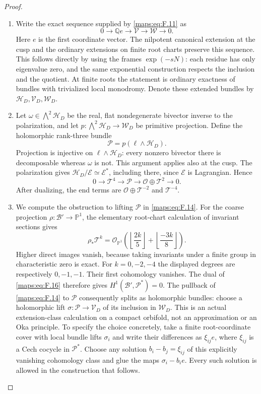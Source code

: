 \begin{proof}
\begin{enumerate}[label=\arabic*.]
\item Write the exact sequence supplied by \eqref{maps:eq:F.11} as
\[
 0\longrightarrow\mathbb Q e\longrightarrow\mathcal V
   \longrightarrow\mathcal W\longrightarrow0.
 \tag{F.14}\label{maps:eq:F.14}
\]
Here $e$ is the first coordinate vector.  The nilpotent canonical
extension at the cusp and the ordinary extensions on finite root
charts preserve this sequence.  This follows directly by using
the frames $\exp(-sN)$: each residue has only eigenvalue zero,
and the same exponential construction respects the inclusion and
the quotient.  At finite roots the statement is ordinary exactness
of bundles with trivialized local monodromy.  Denote these extended
bundles by $\mathcal H_D,\mathcal V_D,\mathcal W_D$.

\item Let $\omega\in\bigwedge^2\mathcal H_D$ be the real, flat
nondegenerate bivector inverse to the polarization, and let
$p:\bigwedge^2\mathcal H_D\to\mathcal W_D$ be primitive projection.
Define the holomorphic rank-three bundle
\[
 \mathcal P=p(\ell\wedge\mathcal H_D).
 \tag{F.15}\label{maps:eq:F.15}
\]
Projection is injective on $\ell\wedge\mathcal H_D$: every
nonzero bivector there is decomposable whereas $\omega$ is not.
This argument applies also at the cusp.  The polarization gives
$\mathcal H_D/\mathcal E\simeq\mathcal E^*$, including there,
since $\mathcal E$ is Lagrangian.  Hence
\[
 0\longrightarrow\mathcal T^4\longrightarrow\mathcal P
 \longrightarrow\mathcal O\oplus\mathcal T^2\longrightarrow0.
 \tag{F.16}\label{maps:eq:F.16}
\]
After dualizing, the end terms are
$\mathcal O\oplus\mathcal T^{-2}$ and $\mathcal T^{-4}$.

\item We compute the obstruction to lifting $\mathcal P$ in \eqref{maps:eq:F.14}.
For the coarse projection $\rho:\mathcal B'\to\mathbb P^1$,
the elementary root-chart calculation of invariant sections gives
\[
 \rho_*\mathcal T^k=
 \mathcal O_{\mathbb P^1}
 \left(\left\lfloor\frac{2k}{5}\right\rfloor+
       \left\lfloor\frac{-3k}{8}\right\rfloor\right).
 \tag{F.17}\label{maps:eq:F.17}
\]
Higher direct images vanish, because taking invariants under a
finite group in characteristic zero is exact.  For $k=0,-2,-4$
the displayed degrees are respectively $0,-1,-1$.  Their first
cohomology vanishes.  The dual of \eqref{maps:eq:F.16} therefore gives
$H^1(\mathcal B',\mathcal P^*)=0$.
The pullback of \eqref{maps:eq:F.14} to $\mathcal P$ consequently splits as
holomorphic bundles: choose a holomorphic lift
$\sigma:\mathcal P\to\mathcal V_D$ of its inclusion in
$\mathcal W_D$.  This is an actual extension-class calculation
on a compact orbifold, not an approximation or an Oka principle.
To specify the choice concretely, take a finite root-coordinate
cover with local bundle lifts $\sigma_i$ and write their
differences as $\xi_{ij}e$, where
$\xi_{ij}$ is a Cech cocycle in $\mathcal P^*$.
Choose any solution $b_i-b_j=\xi_{ij}$ of this explicitly
vanishing cohomology class and glue the maps
$\sigma_i-b_ie$.  Every such solution is allowed in the
construction that follows.


\end{enumerate}
\end{proof}

